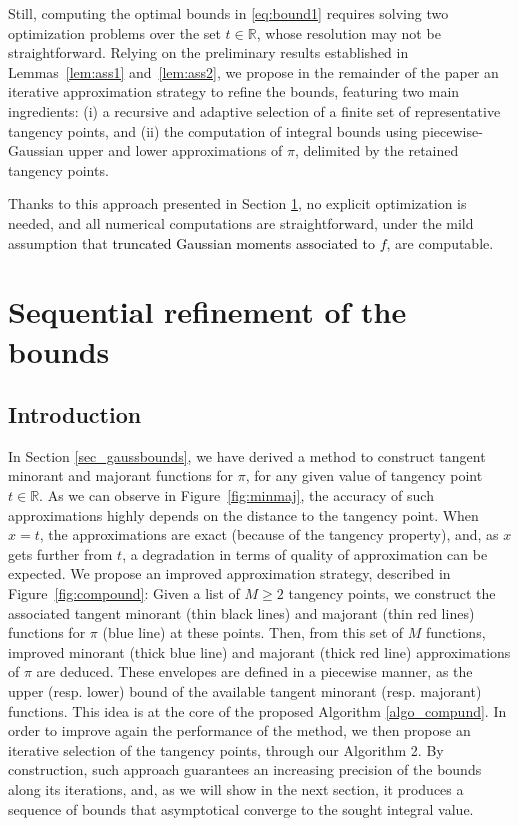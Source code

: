 \documentclass[review]{elsarticle}
\newcommand{\cblue}{\textcolor{black}}
\newcommand{\bR}{\mathbb{R}}
\newcommand{\solal}[1]{\textcolor{green}{\textbf{[{\em SOLAL SAYS}: #1]}}}
\begin{document}
Still, computing the optimal bounds in \eqref{eq:bound1} requires solving two optimization problems over the set $t \in \mathbb{R}$, whose resolution may not be straightforward. Relying on the preliminary results established in Lemmas~\ref{lem:ass1} and~\ref{lem:ass2}, we propose in the remainder of the paper an iterative approximation strategy to refine the bounds, featuring two main ingredients: (i) a recursive and adaptive selection of a finite set of representative tangency points, and (ii) the computation of integral bounds using piecewise-Gaussian upper and lower approximations of $\pi$, delimited by the retained tangency points.

Thanks to this approach presented in Section \ref{sec_compound}, no explicit optimization is needed, and all numerical computations are straightforward, under the mild assumption that \cblue{truncated Gaussian moments associated to $f$}, are computable.%


\section{Sequential refinement of the bounds}
\label{sec_compound}
\subsection{Introduction}

In Section \ref{sec_gaussbounds}, we have derived a method to construct tangent minorant and majorant functions for $\pi$, for any given value of tangency point $t \in \bR$. As we can observe in Figure~\ref{fig:minmaj}, the accuracy of such approximations highly depends on the distance to the tangency point. When $x = t$, the approximations are exact (because of the tangency property), and, as $x$ gets further from $t$, a degradation in terms of quality of approximation can be expected. We propose an improved approximation strategy, described in Figure~\ref{fig:compound}: Given a list of $M \geq 2$ tangency points, we construct the associated tangent minorant (thin black lines) and majorant (thin red lines) functions for $\pi$ (blue line) at these points. Then, from this set of $M$ functions, improved minorant (thick blue line) and majorant (thick red line) approximations of $\pi$ are deduced. These envelopes are defined in a piecewise manner, as the upper (resp. lower) bound of the available tangent minorant (resp. majorant) functions. This idea is at the core of the proposed Algorithm \ref{algo_compund}. In order to improve again the performance of the method, we then propose an iterative selection of the tangency points, through our Algorithm 2. By construction, such approach guarantees an increasing precision of the bounds along its iterations, and, as we will show in the next section, it produces a sequence of bounds that asymptotical converge to the sought integral value.
\end{document}
